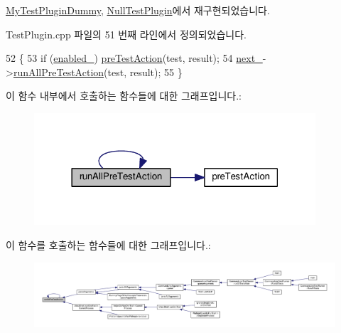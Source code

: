 \hyperlink{class_my_test_plugin_dummy_a00955a64ac9db4a19e3bcd68861ce72f}{My\+Test\+Plugin\+Dummy}, \hyperlink{class_null_test_plugin_ac0a34d45612b2e5e870bfe8d2929a75a}{Null\+Test\+Plugin}에서 재구현되었습니다.



Test\+Plugin.\+cpp 파일의 51 번째 라인에서 정의되었습니다.


\begin{DoxyCode}
52 \{
53     \textcolor{keywordflow}{if} (\hyperlink{class_test_plugin_ab6dfcb3e6c79f4def1295fea7f0de8c0}{enabled\_}) \hyperlink{class_test_plugin_aeb3d3b5a9cbcca6f8f4225bb29554ea2}{preTestAction}(test, result);
54     \hyperlink{class_test_plugin_a9461650e936ee3765377081fb8bc15dc}{next\_}->\hyperlink{class_test_plugin_aa3524b10b0f1613104fa75f1c1a72cf6}{runAllPreTestAction}(test, result);
55 \}
\end{DoxyCode}


이 함수 내부에서 호출하는 함수들에 대한 그래프입니다.\+:
\nopagebreak
\begin{figure}[H]
\begin{center}
\leavevmode
\includegraphics[width=297pt]{class_test_plugin_aa3524b10b0f1613104fa75f1c1a72cf6_cgraph}
\end{center}
\end{figure}




이 함수를 호출하는 함수들에 대한 그래프입니다.\+:
\nopagebreak
\begin{figure}[H]
\begin{center}
\leavevmode
\includegraphics[width=350pt]{class_test_plugin_aa3524b10b0f1613104fa75f1c1a72cf6_icgraph}
\end{center}
\end{figure}


